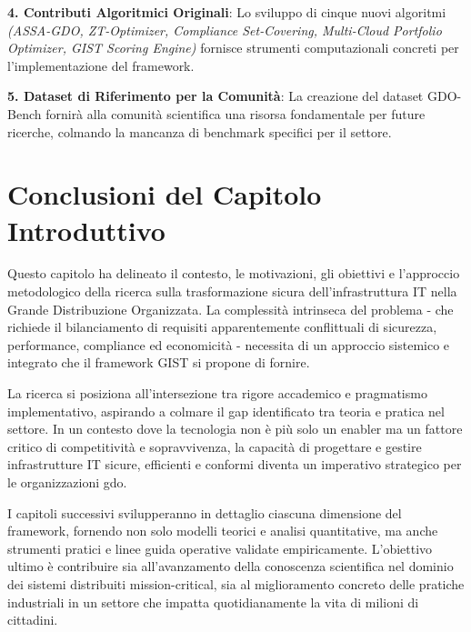 \textbf{4. Contributi Algoritmici Originali}: Lo sviluppo di cinque nuovi algoritmi \emph{(ASSA-GDO, ZT-Optimizer, Compliance Set-Covering, Multi-Cloud Portfolio Optimizer, GIST Scoring Engine)} fornisce strumenti computazionali concreti per l'implementazione del framework.

\textbf{5. Dataset di Riferimento per la Comunità}: La creazione del dataset GDO-Bench fornirà alla comunità scientifica una risorsa fondamentale per future ricerche, colmando la mancanza di benchmark specifici per il settore.

\section{Conclusioni del Capitolo Introduttivo}
\label{sec:conclusioni_cap1}

Questo capitolo ha delineato il contesto, le motivazioni, gli obiettivi e l'approccio metodologico della ricerca sulla trasformazione sicura dell'infrastruttura IT nella Grande Distribuzione Organizzata. La complessità intrinseca del problema - che richiede il bilanciamento di requisiti apparentemente conflittuali di sicurezza, performance, compliance ed economicità - necessita di un approccio sistemico e integrato che il framework GIST si propone di fornire.

La ricerca si posiziona all'intersezione tra rigore accademico e pragmatismo implementativo, aspirando a colmare il gap identificato tra teoria e pratica nel settore. In un contesto dove la tecnologia non è più solo un enabler ma un fattore critico di competitività e sopravvivenza, la capacità di progettare e gestire infrastrutture IT sicure, efficienti e conformi diventa un imperativo strategico per le organizzazioni \gls{gdo}.

I capitoli successivi svilupperanno in dettaglio ciascuna dimensione del framework, fornendo non solo modelli teorici e analisi quantitative, ma anche strumenti pratici e linee guida operative validate empiricamente. L'obiettivo ultimo è contribuire sia all'avanzamento della conoscenza scientifica nel dominio dei sistemi distribuiti mission-critical, sia al miglioramento concreto delle pratiche industriali in un settore che impatta quotidianamente la vita di milioni di cittadini.

\clearpage
\printbibliography[
    heading=subbibliography,
    title={Riferimenti Bibliografici del Capitolo 1},
]

\endrefsection
